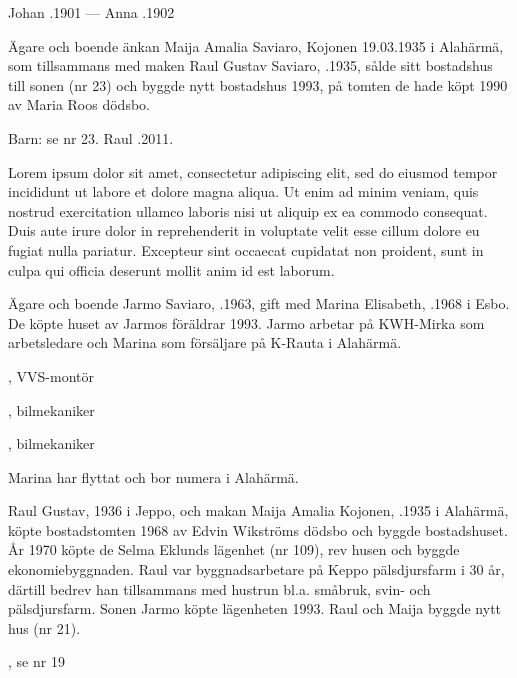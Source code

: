 Johan .1901  ---  Anna .1902






Ägare och boende änkan Maija Amalia Saviaro, \textborn Kojonen 19.03.1935 i Alahärmä, som tillsammans med maken Raul Gustav Saviaro, .1935, sålde sitt bostadshus till sonen (nr 23) och byggde nytt bostadshus 1993, på tomten de hade köpt 1990 av Maria Roos dödsbo.

Barn: se nr 23. Raul .2011.

Lorem ipsum dolor sit amet, consectetur adipiscing elit, sed do eiusmod tempor incididunt ut labore et dolore magna aliqua. Ut enim ad minim veniam, quis nostrud exercitation ullamco laboris nisi ut aliquip ex ea commodo consequat. Duis aute irure dolor in reprehenderit in voluptate velit esse cillum dolore eu fugiat nulla pariatur. Excepteur sint occaecat cupidatat non proident, sunt in culpa qui officia deserunt mollit anim id est laborum. %







Ägare och boende Jarmo Saviaro, .1963, gift med Marina Elisabeth, .1968 i Esbo. De köpte huset av Jarmos föräldrar 1993. Jarmo arbetar på KWH-Mirka som arbetsledare och Marina som försäljare på K-Rauta i Alahärmä.
\begin{jhchildren}
  \item {}, VVS-montör
  \item {}, bilmekaniker
  \item {}, bilmekaniker
\end{jhchildren}
Marina har flyttat och bor numera i Alahärmä.


Raul Gustav,  1936 i Jeppo, och makan Maija Amalia Kojonen, .1935 i Alahärmä, köpte bostadstomten 1968 av Edvin Wikströms dödsbo och byggde bostadshuset. År 1970 köpte de Selma Eklunds lägenhet (nr 109), rev husen och byggde ekonomiebyggnaden. Raul var byggnadsarbetare på Keppo pälsdjursfarm i 30 år, därtill bedrev han tillsammans med hustrun bl.a. småbruk, svin- och pälsdjursfarm. Sonen Jarmo köpte lägenheten 1993. Raul och Maija byggde nytt hus (nr 21).
\begin{jhchildren}
  \item {}, se nr 19
  \item {}
\end{jhchildren}



